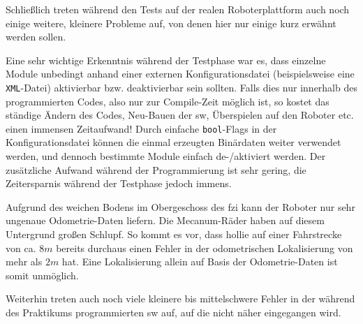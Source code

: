 Schließlich treten während den Tests auf der realen Roboterplattform auch noch einige weitere, kleinere Probleme auf, von denen hier nur einige kurz erwähnt werden sollen.

Eine sehr wichtige Erkenntnis während der Testphase war es, dass einzelne Module unbedingt anhand einer externen Konfigurationsdatei (beispielsweise eine \lstinline{XML}-Datei) aktivierbar bzw. deaktivierbar sein sollten.
Falls dies nur innerhalb des programmierten Codes, also nur zur Compile-Zeit möglich ist, so kostet das ständige Ändern des Codes, Neu-Bauen der \gls{sw}, Überspielen auf den Roboter etc. einen immensen Zeitaufwand!
Durch einfache \lstinline{bool}-Flags in der Konfigurationsdatei können die einmal erzeugten Binärdaten weiter verwendet werden, und dennoch bestimmte Module einfach de-/aktiviert werden.
Der zusätzliche Aufwand während der Programmierung ist sehr gering, die Zeitersparnis während der Testphase jedoch immens.

Aufgrund des weichen Bodens im Obergeschoss des \gls{fzi} kann der Roboter nur sehr ungenaue Odometrie-Daten liefern.
Die Mecanum-Räder haben auf diesem Untergrund großen Schlupf.
So kommt es vor, dass \gls{hollie} auf einer Fahrstrecke von ca. $8m$ bereits durchaus einen Fehler in der odometrischen Lokalisierung von mehr als $2m$ hat.
Eine Lokalisierung allein auf Basis der Odometrie-Daten ist somit unmöglich.

Weiterhin treten auch noch viele kleinere bis mittelschwere Fehler in der während des Praktikums programmierten \gls{sw} auf, auf die nicht näher eingegangen wird.






